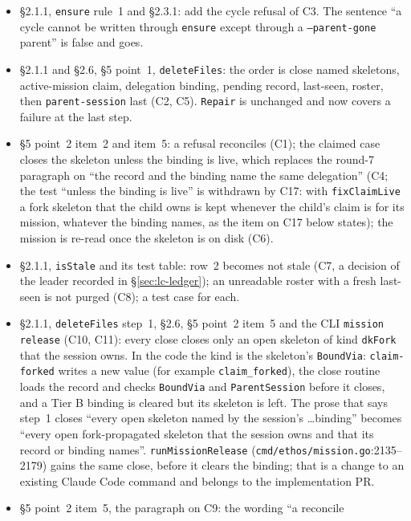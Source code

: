 \documentclass[a4paper,10pt,fleqn]{article}
\newcommand{\fpath}[1]{\texttt{#1}}
\newcommand{\field}[1]{\texttt{#1}}
\begin{document}
\begin{itemize}
  \item \S2.1.1, \field{ensure} rule~1 and \S2.3.1: add the cycle refusal of
    C3. The sentence ``a cycle cannot be written through \field{ensure}
    except through a \field{--parent-gone} parent'' is false and goes.
  \item \S2.1.1 and \S2.6, \S5 point~1, \field{deleteFiles}: the order is
    close named skeletons, active-mission claim, delegation binding,
    pending record, last-seen, roster, then \fpath{parent-session} last
    (C2, C5). \field{Repair} is unchanged and now covers a failure at the
    last step.
  \item \S5 point~2 item~2 and item~5: a refusal reconciles (C1); the claimed
    case closes the skeleton unless the binding is live, which replaces the
    round-7 paragraph on ``the record and the binding name the same
    delegation'' (C4; the test ``unless the binding is live'' is withdrawn by
    C17: with \field{fixClaimLive} a fork skeleton that the child owns is
    kept whenever the child's claim is for its mission, whatever the binding
    names, as the item on C17 below states); the mission is re-read once the skeleton is on disk
    (C6).
  \item \S2.1.1, \field{isStale} and its test table: row~2 becomes not
    stale (C7, a decision of the leader recorded in
    \S\ref{sec:lc-ledger}); an unreadable roster with a fresh last-seen is
    not purged (C8); a test case for each.
  \item \S2.1.1, \field{deleteFiles} step~1, \S2.6, \S5 point~2 item~5 and the
    CLI \field{mission release} (C10, C11): every close closes only an open
    skeleton of kind \field{dkFork} that the session owns. In the code the
    kind is the skeleton's \field{BoundVia}: \field{claim-forked} writes a new
    value (for example \texttt{claim\_forked}), the close routine loads the
    record and checks \field{BoundVia} and \field{ParentSession} before it
    closes, and a Tier B binding is cleared but its skeleton is left. The
    prose that says step~1 closes ``every open skeleton named by the
    session's \ldots binding'' becomes ``every open fork-propagated skeleton
    that the session owns and that its record or binding names''.
    \field{runMissionRelease} (\fpath{cmd/ethos/mission.go}:2135--2179) gains
    the same close, before it clears the binding; that is a change to an
    existing Claude Code command and belongs to the implementation PR.
  \item \S5 point~2 item~5, the paragraph on C9: the wording ``a reconcile

\end{itemize}
\end{document}
